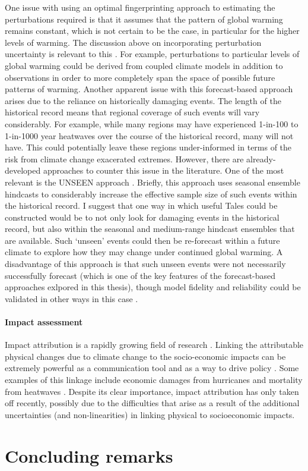       One issue with using an optimal fingerprinting approach to estimating the perturbations required is that it assumes that the pattern of global warming remains constant, which is not certain to be the case, in particular for the higher levels of warming. The discussion above on incorporating perturbation uncertainty is relevant to this \citep{zhou_greater_2021}. For example, perturbations to particular levels of global warming could be derived from coupled climate models in addition to observations in order to more completely span the space of possible future patterns of warming. Another apparent issue with this forecast-based approach arises due to the reliance on historically damaging events. The length of the historical record means that regional coverage of such events will vary considerably. For example, while many regions may have experienced 1-in-100 to 1-in-1000 year heatwaves over the course of the historical record, many will not have. This could potentially leave these regions under-informed in terms of the risk from climate change exacerated extremes. However, there are already-developed approaches to counter this issue in the literature. One of the most relevant is the UNSEEN approach \citep{thompson_high_2017,kelder_using_2020}. Briefly, this approach uses seasonal ensemble hindcasts to considerably increase the effective sample size of such events within the historical record. I suggest that one way in which useful Tales could be constructed would be to not only look for damaging events in the historical record, but also within the seasonal and medium-range hindcast ensembles that are available. Such `unseen' events could then be re-forecast within a future climate to explore how they may change under continued global warming. A disadvantage of this approach is that such unseen events were not necessarily successfully forecast (which is one of the key features of the forecast-based approaches exlpored in this thesis), though model fidelity and reliability could be validated in other ways in this case \citep{kelder_interpreting_2022}.

    \paragraph*{Impact assessment}

      Impact attribution is a rapidly growing field of research \citep{perkins-kirkpatrick_attribution_2022,burger_law_2020}. Linking the attributable physical changes due to climate change to the socio-economic impacts can be extremely powerful as a communication tool and as a way to drive policy \citep{clarke_inventories_2021}. Some examples of this linkage include economic damages from hurricanes \citep{frame_economic_2020,strauss_economic_2021} and mortality from heatwaves \citep{mitchell_attributing_2016,mitchell_climate_2021,lo_estimating_2022}. Despite its clear importance, impact attribution has only taken off recently, possibly due to the difficulties that arise as a result of the additional uncertainties (and non-linearities) in linking physical to socioeconomic impacts. 

\section{Concluding remarks}